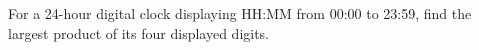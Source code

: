 For a 24-hour digital clock displaying HH:MM from 00:00 to 23:59, find the largest product of its four displayed digits.
